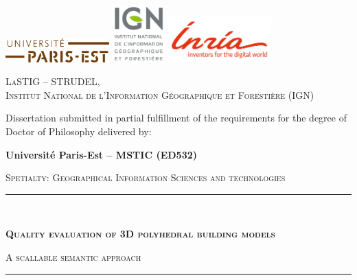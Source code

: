 \begin{titlepage}
    \begin{center}
        \includegraphics[width=4cm]{images/logos/paris-est_logo}
        \includegraphics[width=2cm]{images/logos/ign_logo}
        \includegraphics[width=4cm]{images/logos/inr_logo_eng_rouge_150}\\
    
        \vspace*{10mm}

        \begin{minipage}{.5\textwidth}
            \centering
            \textsc{LaSTIG -- STRUDEL,\\ Institut National de l'Information Géographique et Forestière (IGN)}
        \end{minipage}

        \vfill

        Dissertation submitted in partial fulfillment of the requirements for the degree of Doctor of Philosophy delivered by:

        \vspace*{5mm}

        \begin{Large}
            \textbf{Université Paris-Est -- MSTIC (ED532)}
        \end{Large}

        \vspace*{10mm}
        \begin{large}
            \textsc{Spetialty: Geographical Information Sciences and technologies}
        \end{large}
        \vspace*{10mm}

        \rule{\textwidth}{1.5pt}\\
        \begin{LARGE}
            \textsc{\textbf{Quality evaluation of 3D polyhedral building models}}\\
        \end{LARGE}
        \vspace*{2.5mm}
        \begin{Large}
            \textsc{A scallable semantic approach}
        \end{Large}
        \rule{\textwidth}{1.5pt}\\


\end{center}
\end{titlepage}
